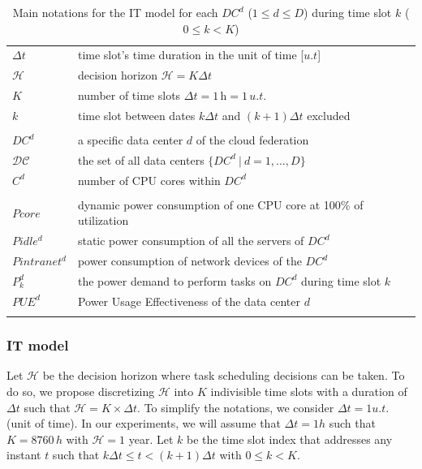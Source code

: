 \begin{table}[!t]
\caption{Main notations for the IT model for each $DC^d$ ($1\leq d\leq D$) during time slot $k$ ($0\leq k< K$)\label{table:variablesIT}}
\label{tab:notations_it_model}
\begin{center}
\begin{tabular}{l p{11cm}}


$\Delta t$ & time slot's time duration in the unit of time [$u.t$] \\
$\mathcal{H}$ & decision horizon $\mathcal{H} = K\Delta t$ \\
$K$ & number of time slots $\Delta t = 1\,\text{h} = 1\,u.t.$ \\ 
$k$ & time slot between dates $k\Delta t$ and $(k+1)\Delta t$ excluded \\ \\
$DC^d$ & a specific data center $d$ of the cloud federation \\
$\mathcal{DC}$ & the set of all data centers $\{DC^d \ | \ d=1, \ldots, D\}$ \\
$C^d$ & number of CPU cores within $DC^d$ \\
\\
$Pcore$ & dynamic power consumption of one CPU core at 100\% of utilization \\
$Pidle^d$ & static power consumption of all the servers of $DC^d$ \\
$Pintranet^d$ & power consumption of network devices of the $DC^d$  \\
$P_k^d$ & the power demand to perform tasks on $DC^d$ during time slot $k$ \\ 
$PUE^d$ & Power Usage Effectiveness of the data center $d$\\ 
\\\end{tabular}
\end{center}
\end{table}




\subsubsection{IT model} 
\label{sec:it_model_ccgrid}
Let $\mathcal{H}$  be the decision horizon where task scheduling decisions can be taken. To do so, we propose discretizing $\mathcal{H}$ into $K$ indivisible time slots with a duration of $\Delta t$ such that $\mathcal{H} = K\times\Delta t$. To simplify the notations, we consider $\Delta t = 1 u.t.$ (unit of time). In our experiments, we will assume that $\Delta t = 1h$ such that $K = 8760\,h$ with $\mathcal{H} = 1$ year. 
Let $k$ be the time slot index that addresses any instant $t$ such that $k\Delta t\leq t < (k+1)\Delta t$ with $0\leq k< K$. 

